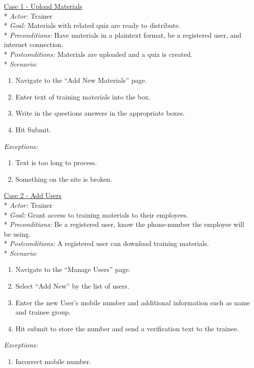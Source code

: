 \underline{Case 1 - Upload Materials}\\*
\textit{Actor:} Trainer\\*
\textit{Goal:} Materials with related quiz are ready to distribute.\\*
\textit{Preconditions:} Have materials in a plaintext format, be a registered user, and internet connection.\\*
\textit{Postconditions:} Materials are uploaded and a quiz is created.\\*
\textit{Scenario:}
\begin{enumerate}
	\item{Navigate to the “Add New Materials” page.}
	\item{Enter text of training materials into the box.}
	\item{Write in the questions answers in the appropriate boxes.}
	\item{Hit Submit.}
\end{enumerate}
\textit{Exceptions:}
\begin{enumerate}
	\item{Text is too long to process.}
	\item{Something on the site is broken.}\\
\end{enumerate}

\underline{Case 2 - Add Users}\\*
\textit{Actor:} Trainer\\*
\textit{Goal:} Grant access to training materials to their employees.\\*
\textit{Preconditions:} Be a registered user, know the phone-number the employee will be using.\\*
\textit{Postconditions:} A registered user can download training materials.\\*
\textit{Scenario:}
\begin{enumerate}
	\item{Navigate to the “Manage Users” page.}
	\item{Select “Add New” by the list of users.}
	\item{Enter the new User’s mobile number and additional information such as name and trainee group.}
	\item{Hit submit to store the number and send a verification text to the trainee.}
\end{enumerate}
\textit{Exceptions:}
\begin{enumerate}
	\item{Incorrect mobile number.}\\
\end{enumerate}

